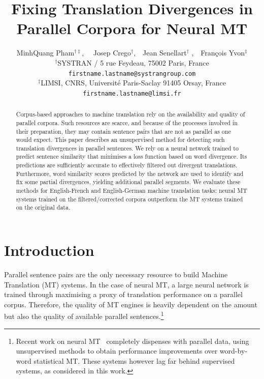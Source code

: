 \documentclass[11pt,a4paper]{article}
\title{Fixing Translation Divergences in Parallel Corpora for Neural MT}
\author{MinhQuang Pham$^{\dag\ddag}$, \ \ Josep Crego$^\dag$,\ \ Jean Senellart$^\dag$ ,\ \ Fran\c cois Yvon$^\ddag$\\
  $^\dag$SYSTRAN / 5 rue Feydeau, 75002 Paris, France\\
  {\tt firstname.lastname@systrangroup.com}\\
  $^\ddag$LIMSI, CNRS,  Universit\'e Paris-Saclay 91405 Orsay, France\\
  {\tt firstname.lastname@limsi.fr}}
\date{}
\begin{document}
\maketitle

\begin{abstract}

Corpus-based approaches to machine translation rely on the availability and quality of parallel corpora.
Such resources are scarce, and because of the processes involved in their preparation, they may contain sentence pairs that are not as parallel as one would expect.
This paper describes an unsupervised method for detecting such translation divergences in parallel sentences. We rely on a  neural network trained
to predict sentence similarity that minimises a loss function based on word divergence. Its predictions are sufficiently accurate to effectively filtered out divergent translations.
Furthermore, word similarity scores predicted by the network are used to identify and fix some partial divergences, yielding additional parallel segments.
We evaluate these methods for  English-French and  English-German machine translation tasks: 
neural MT systems trained on the filtered/corrected corpora outperform the MT systems trained on the original data.

\end{abstract}

\section{Introduction}

Parallel sentence pairs are the only necessary resource to build Machine Translation (MT) systems. 
In the case of neural MT, a large neural network is trained through maximising a proxy of translation performance on a parallel corpus. 
Therefore, the quality of MT engines is heavily dependent on the amount but also the quality of available parallel sentences.\footnote{Recent work on neural MT~\cite{lample2018word,artetxe2018iclr} completely dispenses with parallel data, using unsupervised methods to obtain performance improvements over word-by-word statistical MT. These systems however lag far behind supervised systems, as considered in this work.} 
\end{document}
